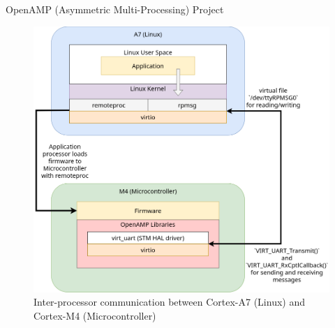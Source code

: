 \documentclass[8pt,compress,aspectratio=169]{beamer}
\begin{document}
\begin{frame}
\begin{minipage}{0.465\textwidth}
\begin{block}{OpenAMP (Asymmetric Multi-Processing) Project}
    \end{block}
  \end{minipage}
  \hfill
  \begin{minipage}{0.465\textwidth}
    \begin{figure}
      \includegraphics[width=\textwidth]{assets/diagrams/ipc.drawio.png}
      \caption{Inter-processor communication between Cortex-A7 (Linux) and Cortex-M4 (Microcontroller)}
    \end{figure}
  \end{minipage}
\end{frame}

\end{document}
